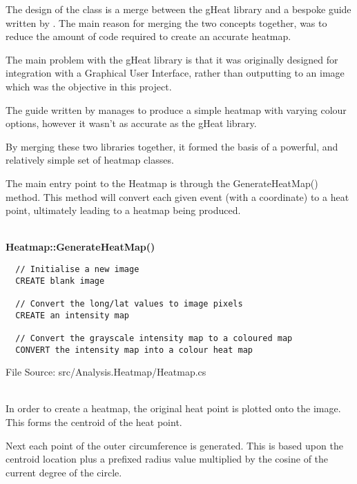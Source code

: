 The design of the class is a merge between the gHeat library \citep{gHeat} and
a bespoke guide written by \citeauthor{vester} \citep{vester}. The main reason
for merging the two concepts together, was to reduce the amount of code 
required to create an accurate heatmap.

The main problem with the gHeat library is that it was originally designed for 
integration with a Graphical User Interface, rather than outputting to an image 
which was the objective in this project.

The guide written by \citeauthor{vester} manages to produce a simple heatmap 
with varying colour options, however it wasn't as accurate as the gHeat 
library. 

By merging these two libraries together, it formed the basis of a powerful, 
and relatively simple set of heatmap classes.

The main entry point to the Heatmap is through the {\ttfamily GenerateHeatMap()}
method. This method will convert each given event (with a coordinate) to a heat
point, ultimately leading to a heatmap being produced.

~\\
{\bfseries Heatmap::GenerateHeatMap()}
\lstset{style=pseudocode}
\begin{lstlisting}
  // Initialise a new image
  CREATE blank image

  // Convert the long/lat values to image pixels
  CREATE an intensity map
 
  // Convert the grayscale intensity map to a coloured map
  CONVERT the intensity map into a colour heat map
\end{lstlisting}
{\textsf \footnotesize File Source: src/Analysis.Heatmap/Heatmap.cs }

~\\
In order to create a heatmap, the original heat point is plotted onto the 
image. This forms the centroid of the heat point. 

Next each point of the outer circumference is generated. This is based upon the
centroid location plus a prefixed radius value multiplied by the cosine of the 
current degree of the circle.

